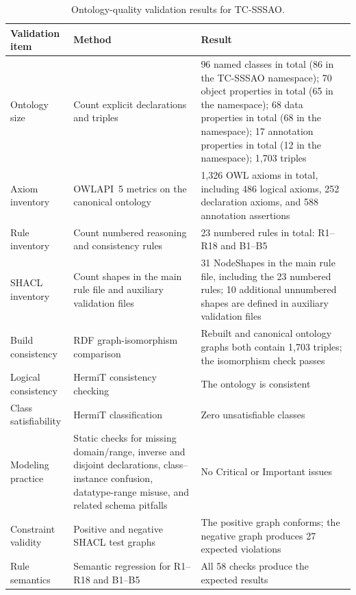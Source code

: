 \documentclass[Royal,sageh,times]{sagej}
\begin{document}
\begin{table}[!t]
  \centering
  \caption{Ontology-quality validation results for TC-SSSAO.}
  \label{tab:ontology-quality}
  \footnotesize
  \begin{tabularx}{\textwidth}{p{}p{}Y}
    \toprule
    \textbf{Validation item} & \textbf{Method} & \textbf{Result} \\
    \midrule
    Ontology size & Count explicit declarations and triples & 96 named classes in total (86 in the TC-SSSAO namespace); 70 object properties in total (65 in the namespace); 68 data properties in total (68 in the namespace); 17 annotation properties in total (12 in the namespace); 1,703 triples \\
    Axiom inventory & OWLAPI~5 metrics on the canonical ontology~\citep{horridge2011owlapi} & 1,326 OWL axioms in total, including 486 logical axioms, 252 declaration axioms, and 588 annotation assertions \\
    Rule inventory & Count numbered reasoning and consistency rules & 23 numbered rules in total: R1--R18 and B1--B5 \\
    SHACL inventory & Count shapes in the main rule file and auxiliary validation files & 31 NodeShapes in the main rule file, including the 23 numbered rules; 10 additional unnumbered shapes are defined in auxiliary validation files \\
    Build consistency & RDF graph-isomorphism comparison & Rebuilt and canonical ontology graphs both contain 1,703 triples; the isomorphism check passes \\
    Logical consistency & HermiT consistency checking & The ontology is consistent \\
    Class satisfiability & HermiT classification & Zero unsatisfiable classes \\
    Modeling practice & Static checks for missing domain/range, inverse and disjoint declarations, class--instance confusion, datatype-range misuse, and related schema pitfalls & No Critical or Important issues \\
    Constraint validity & Positive and negative SHACL test graphs & The positive graph conforms; the negative graph produces 27 expected violations \\
    Rule semantics & Semantic regression for R1--R18 and B1--B5 & All 58 checks produce the expected results \\
    \bottomrule
  \end{tabularx}
\end{table}
\end{document}
